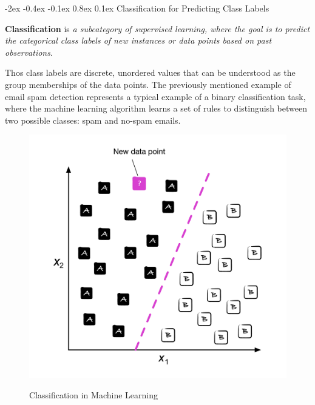 \documentclass[12pt]{report}
\makeatletter
\renewcommand{\subsection}{\@startsection{subsection}{2}{\z@}%
  {-2ex \@plus -0.4ex \@minus -0.1ex}%
  {0.8ex \@plus 0.1ex}%
  {\normalfont\large\subsectionstyle}}
\newcommand{\subsectionstyle}[1]{%
  \par\noindent\hrule
  \vspace{-0.4ex}%
  {\scshape #1\par}%
  \vspace{0.4ex}%
  \hrule
}
\theoremstyle{largebreak}
\makeatother
\begin{document}
    \subsection{Classification for Predicting Class Labels}

    \begin{mydef}
        \textbf{Classification} is \textit{a subcategory of supervised learning, where the goal is to predict the categorical class labels of new instances or data points based on past observations}.
    \end{mydef}

    Thos class labels are discrete, unordered values that can be understood as the group memberships of the data points. The previously mentioned example of email spam detection represents a typical example of a binary classification task, where the machine learning algorithm learns a set of rules to distinguish between two possible classes: spam and no-spam emails.

    \begin{figure}[h]
        \begin{minipage}{\textwidth}
            \centering
            \includegraphics[scale=1]{images/classification_ml} \\
            \caption{Classification in Machine Learning}
            \label{figure:classification_ml}
        \end{minipage}
    \end{figure}
\end{document}
